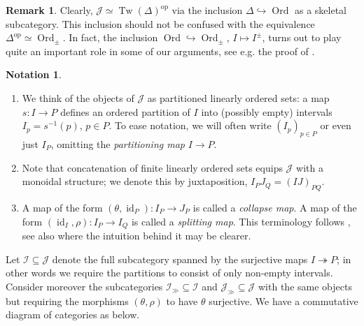 \documentclass[12pt, reqno]{amsart}
\theoremstyle{plain}
\theoremstyle{definition}
\newtheorem{remark}[theorem]{Remark}
\newtheorem{notation}[theorem]{Notation}
\begin{document}
\begin{remark}
Clearly, $\mathcal{J}\simeq \operatorname{Tw}(\Delta)^{\operatorname{op}}$ via the inclusion $\Delta\hookrightarrow \operatorname{Ord}$ as a skeletal subcategory. This inclusion should not be confused with the equivalence $\Delta^{\operatorname{op}}\simeq \operatorname{Ord}_\pm$. In fact, the inclusion $\operatorname{Ord}\hookrightarrow \operatorname{Ord}_\pm$, $I\mapsto I^\pm$, turns out to play quite an important role in some of our arguments, see e.g. the proof of .
\end{remark}

\begin{notation} \ 
\begin{enumerate}
\item We think of the objects of $\mathcal{J}$ as partitioned linearly ordered sets: a map $s\colon I\rightarrow P$ defines an ordered partition of $I$ into (possibly empty) intervals $I_p=s^{-1}(p)$, $p\in P$. To ease notation, we will often write $(I_p)_{p\in P}$ or even just $I_P$, omitting the \textit{partitioning map} $I\rightarrow P$.
\item Note that concatenation of finite linearly ordered sets equips $\mathcal{J}$ with a monoidal structure; we denote this by juxtaposition, $I_PJ_Q=(IJ)_{PQ}$.
\item A map of the form $(\theta,\operatorname{id}_P)\colon I_P\rightarrow J_P$ is called a \textit{collapse map}. A map of the form $(\operatorname{id}_I,\rho)\colon I_P\rightarrow I_Q$ is called a \textit{splitting map}. This terminology follows \cite{Yuan}, see also  where the intuition behind it may be clearer. \qedhere
\end{enumerate}
\end{notation}

Let $\mathcal{I}\subseteq\mathcal{J}$ denote the full subcategory spanned by the surjective maps $I\twoheadrightarrow P$; in other words we require the partitions to consist of only non-empty intervals. Consider moreover the subcategories $\mathcal{I}_\gg\subseteq \mathcal{I}$ and $\mathcal{J}_\gg\subseteq \mathcal{J}$ with the same objects but requiring the morphisms $(\theta,\rho)$ to have $\theta$ surjective. We have a commutative diagram of categories as below.

\begin{center}
\end{center}
\end{document}
